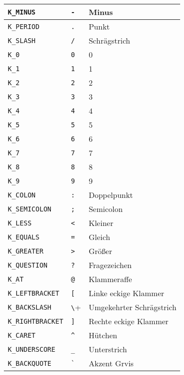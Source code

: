\begin{longtable}{lll}
\texttt{K\_MINUS}        &  \verb+-+     &  Minus\\ \hline
\texttt{K\_PERIOD}       &  \verb+.+     &  Punkt\\ \hline
\texttt{K\_SLASH}        &  \verb+/+     &  Schrägstrich\\ \hline
\texttt{K\_0}            &  \verb+0+     &  0\\ \hline
\texttt{K\_1}            &  \verb+1+     &  1\\ \hline
\texttt{K\_2}            &  \verb+2+     &  2\\ \hline
\texttt{K\_3}            &  \verb+3+     &  3\\ \hline
\texttt{K\_4}            &  \verb+4+     &  4\\ \hline
\texttt{K\_5}            &  \verb+5+     &  5\\ \hline
\texttt{K\_6}            &  \verb+6+     &  6\\ \hline
\texttt{K\_7}            &  \verb+7+     &  7\\ \hline
\texttt{K\_8}            &  \verb+8+     &  8\\ \hline
\texttt{K\_9}            &  \verb+9+     &  9\\ \hline
\texttt{K\_COLON}        &  \verb+:+     &  Doppelpunkt\\ \hline
\texttt{K\_SEMICOLON}    &  \verb+;+     &  Semicolon\\ \hline
\texttt{K\_LESS}         &  \verb+<+     &  Kleiner\\ \hline
\texttt{K\_EQUALS}       &  \verb+=+     &  Gleich\\ \hline
\texttt{K\_GREATER}      &  \verb+>+     &  Größer\\ \hline
\texttt{K\_QUESTION}     &  \verb+?+     &  Fragezeichen\\ \hline
\texttt{K\_AT}           &  \makeatletter \verb+@+ \makeatother    &  Klammeraffe\\ \hline
\texttt{K\_LEFTBRACKET}  &  \verb+[+     &  Linke eckige Klammer\\ \hline
\texttt{K\_BACKSLASH}    &  \verb+\+     &  Umgekehrter Schrägstrich\\ \hline
\texttt{K\_RIGHTBRACKET} &  \verb+]+     &  Rechte eckige Klammer\\ \hline
\texttt{K\_CARET}        &  \verb+^+     &  Hütchen\\ \hline
\texttt{K\_UNDERSCORE}   &  \verb+_+     &  Unterstrich\\ \hline
\texttt{K\_BACKQUOTE}    &  \verb+`+     &  Akzent Grvis\\ \hline

\end{longtable}
